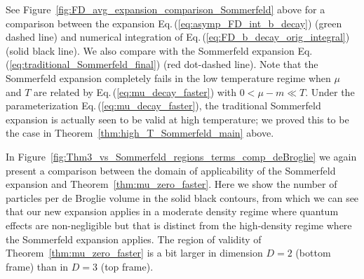 \documentclass[sn-mathphys,Numbered]{sn-jnl}
\newcommand{\req}[1]{Eq.\,(\ref{#1})}
\newcommand{\rf}[1]{Figure~{\ref{#1}}}
\newcommand{\rTh}[1]{Theorem~{\ref{#1}}}
\begin{document}
See \rf{fig:FD_avg_expansion_comparison_Sommerfeld} above for a comparison between the expansion \req{eq:asymp_FD_int_b_decay} (green dashed line) and numerical integration of \req{eq:FD_b_decay_orig_integral} (solid black line). We also compare with the Sommerfeld expansion \req{eq:traditional_Sommerfeld_final} (red dot-dashed line). Note that the Sommerfeld expansion completely fails in the low temperature regime when $\mu$ and $T$ are related by \req{eq:mu_decay_faster} with $0<\mu-m\ll T$. Under the parameterization \req{eq:mu_decay_faster}, the traditional Sommerfeld expansion is actually seen to be valid at high temperature; we proved this to be the case in \rTh{thm:high_T_Sommerfeld_main} above. 

In \rf{fig:Thm3_vs_Sommerfeld_regions_terms_comp_deBroglie} we again present a comparison between the domain of applicability of the Sommerfeld expansion and \rTh{thm:mu_zero_faster}. Here we show the number of particles per de Broglie volume in the solid black contours, from which we can see that our new expansion applies in a moderate density regime where quantum effects are non-negligible but that is distinct from the high-density regime where the Sommerfeld expansion applies. The region of validity of \rTh{thm:mu_zero_faster} is a bit larger in dimension $D=2$ (bottom frame) than in $D=3$ (top frame).
\end{document}
